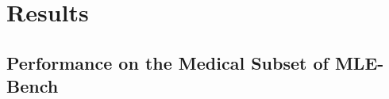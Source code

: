 \documentclass{midl} %
\begin{document}


\section{Results}
\label{sec:results}

\subsection{Performance on the Medical Subset of MLE-Bench}
\end{document}
